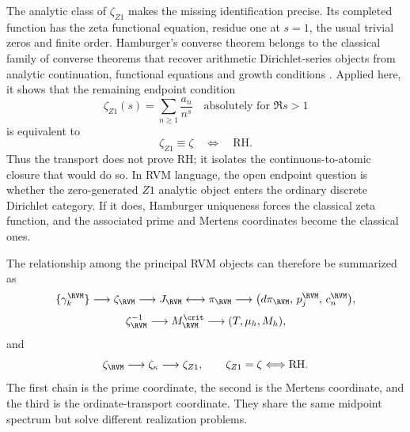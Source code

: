 The analytic class of $\zeta_{Z1}$ makes the missing identification precise.
Its completed function has the zeta functional equation, residue one at
$s=1$, the usual trivial zeros and finite order.  Hamburger's converse theorem
belongs to the classical family of converse theorems that recover arithmetic
Dirichlet-series objects from analytic continuation, functional equations and
growth conditions \cite{Hamburger1921,Perelli2016}.  Applied here, it shows
that the remaining endpoint condition
\begin{equation}
 \tag{D}
 \zeta_{Z1}(s)=\sum_{n\ge1}\frac{a_n}{n^s}
 \quad\text{absolutely for }\Re s>1
 \label{eq:intro-D}
\end{equation}
is equivalent to
\begin{equation}
 \zeta_{Z1}\equiv\zeta
 \quad\Longleftrightarrow\quad
 \mathrm{RH}.
 \label{eq:intro-endpoint}
\end{equation}
Thus the transport does not prove RH; it isolates the continuous-to-atomic
closure that would do so.  In RVM language, the open endpoint question is
whether the zero-generated $Z1$ analytic object enters the ordinary discrete
Dirichlet category.  If it does, Hamburger uniqueness forces the classical
zeta function, and the associated prime and Mertens coordinates become the
classical ones.

The relationship among the principal RVM objects can therefore be summarized
as
\begin{equation}
 \{\gamma_k^{\RVM}\}
 \longrightarrow
 \zeta_{\RVM}
 \longrightarrow
 J_{\RVM}
 \longleftrightarrow
 \pi_{\RVM}
 \longrightarrow
 \bigl(d\pi_{\RVM},\,p_j^{\RVM},\,c_n^{\RVM}\bigr),
 \label{eq:intro-prime-chain}
\end{equation}
\begin{equation}
 \zeta_{\RVM}^{-1}
 \longrightarrow
 M_{\RVM}^{\crit}
 \longrightarrow
 (T,\mu_h,M_h),
 \label{eq:intro-M-chain}
\end{equation}
and
\begin{equation}
 \zeta_{\RVM}
 \longrightarrow
 \zeta_\kappa
 \longrightarrow
 \zeta_{Z1},
 \qquad
 \zeta_{Z1}=\zeta
 \Longleftrightarrow \mathrm{RH}.
 \label{eq:intro-transport-chain}
\end{equation}
The first chain is the prime coordinate, the second is the Mertens coordinate,
and the third is the ordinate-transport coordinate.  They share the same
midpoint spectrum but solve different realization problems.

